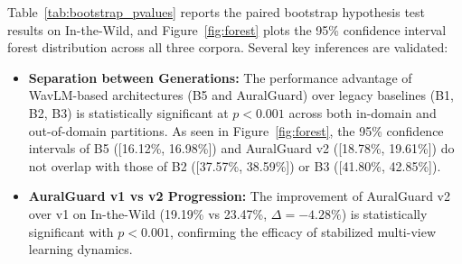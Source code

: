 \begin{table}[t]
\centering
\caption{Paired bootstrap hypothesis testing ($p$-values) on the difference in EER ($\Delta \mathrm{EER} = \mathrm{EER}_A - \mathrm{EER}_B$) over 1,000 bootstrap resamples on the In-the-Wild benchmark. Statistical significance at $p < 0.001$ is indicated by $^{***}$.}
\label{tab:bootstrap_pvalues}
\setlength{\tabcolsep}{3.5pt}
\footnotesize
{}
\end{table}

Table~\ref{tab:bootstrap_pvalues} reports the paired bootstrap hypothesis test results on In-the-Wild, and Figure~\ref{fig:forest} plots the 95\% confidence interval forest distribution across all three corpora. Several key inferences are validated:
\begin{itemize}
    \item \textbf{Separation between Generations:} The performance advantage of WavLM-based architectures (B5 and AuralGuard) over legacy baselines (B1, B2, B3) is statistically significant at $p < 0.001$ across both in-domain and out-of-domain partitions. As seen in Figure~\ref{fig:forest}, the 95\% confidence intervals of B5 ([16.12\%, 16.98\%]) and AuralGuard v2 ([18.78\%, 19.61\%]) do not overlap with those of B2 ([37.57\%, 38.59\%]) or B3 ([41.80\%, 42.85\%]).
    \item \textbf{AuralGuard v1 vs v2 Progression:} The improvement of AuralGuard v2 over v1 on In-the-Wild (19.19\% vs 23.47\%, $\Delta = -4.28\%$) is statistically significant with $p < 0.001$, confirming the efficacy of stabilized multi-view learning dynamics.
\end{itemize}

